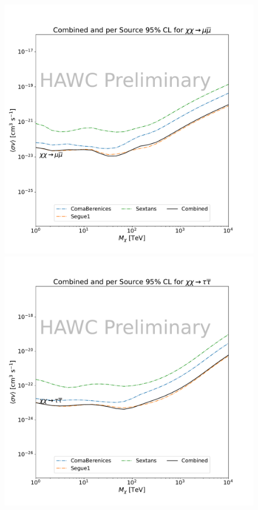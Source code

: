\begin{figure}[h]
{    \includegraphics[scale=0.21]{figures/mtd_hawc_dm/results/Combined95_New_duck_mumu_.pdf}
    \includegraphics[scale=0.21]{figures/mtd_hawc_dm/results/Combined95_New_duck_tautau_.pdf}
}
\end{figure}
